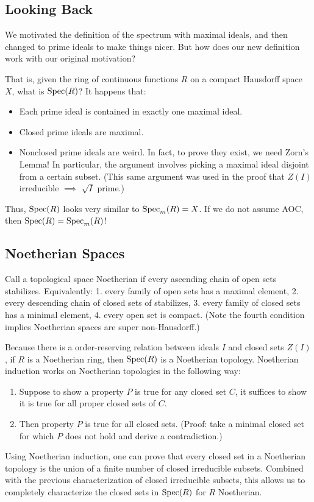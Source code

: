\subsection{Looking Back}
We motivated the definition of the spectrum with maximal ideals, and then changed to prime ideals to make things nicer. But how does our new definition work with our original motivation?

That is, given the ring of continuous functions $R$ on a compact Hausdorff space $X$, what is $\operatorname{Spec}(R)$? It happens that:
\begin{itemize}
    \item Each prime ideal is contained in exactly one maximal ideal.
    \item Closed prime ideals are maximal.
    \item Nonclosed prime ideals are weird. In fact, to prove they exist, we need Zorn's Lemma! In particular, the argument involves picking a maximal ideal disjoint from a certain subset. (This same argument was used in the proof that $Z(I)$ irreducible $\implies$ $\sqrt{I}$ prime.)
\end{itemize}
Thus, $\operatorname{Spec}(R)$ looks very similar to $\operatorname{Spec}_m(R) = X$. If we do not assume AOC, then $\operatorname{Spec}(R) = \operatorname{Spec}_m(R)$!

\subsection{Noetherian Spaces}
Call a topological space Noetherian if every ascending chain of open sets stabilizes. Equivalently: 1. every family of open sets has a maximal element, 2. every descending chain of closed sets of stabilizes, 3. every family of closed sets has a minimal element, 4. every open set is compact. (Note the fourth condition implies Noetherian spaces are super non-Hausdorff.)

Because there is a order-reserving relation between ideals $I$ and closed sets $Z(I)$, if $R$ is a Noetherian ring, then $\operatorname{Spec}(R)$ is a Noetherian topology. Noetherian induction works on Noetherian topologies in the following way:
\begin{enumerate}
    \item Suppose to show a property $P$ is true for any closed set $C$, it suffices to show it is true for all proper closed sets of $C$.
    \item Then property $P$ is true for all closed sets. (Proof: take a minimal closed set for which $P$ does not hold and derive a contradiction.)
\end{enumerate}
Using Noetherian induction, one can prove that every closed set in a Noetherian topology is the union of a finite number of closed irreducible subsets. Combined with the previous characterization of closed irreducible subsets, this allows us to completely characterize the closed sets in $\operatorname{Spec}(R)$ for $R$ Noetherian.

